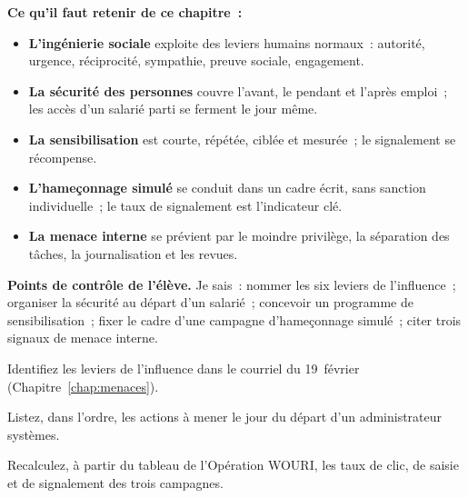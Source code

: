 \separateur

\begin{boxresume}
\textbf{Ce qu'il faut retenir de ce chapitre~:}
\begin{itemize}
    \item \textbf{L'ingénierie sociale} exploite des leviers humains
          normaux~: autorité, urgence, réciprocité, sympathie, preuve
          sociale, engagement.
    \item \textbf{La sécurité des personnes} couvre l'avant, le pendant et
          l'après emploi~; les accès d'un salarié parti se ferment le jour
          même.
    \item \textbf{La sensibilisation} est courte, répétée, ciblée et
          mesurée~; le signalement se récompense.
    \item \textbf{L'hameçonnage simulé} se conduit dans un cadre écrit, sans
          sanction individuelle~; le taux de signalement est l'indicateur
          clé.
    \item \textbf{La menace interne} se prévient par le moindre privilège,
          la séparation des tâches, la journalisation et les revues.
\end{itemize}
\end{boxresume}

\begin{boxinfo}
\textbf{Points de contrôle de l'élève.} Je sais~: nommer les six leviers
de l'influence~; organiser la sécurité au départ d'un salarié~; concevoir
un programme de sensibilisation~; fixer le cadre d'une campagne
d'hameçonnage simulé~; citer trois signaux de menace interne.
\end{boxinfo}

\bigskip

\begin{boxexo}[title={\ding{45}\quad Exercice~9.1. Les leviers \niveaubase}]
Identifiez les leviers de l'influence dans le courriel du 19~février
(Chapitre~\ref{chap:menaces}).
\end{boxexo}

\begin{boxexo}[title={\ding{45}\quad Exercice~9.2. Le départ \niveaubase}]
Listez, dans l'ordre, les actions à mener le jour du départ d'un
administrateur systèmes.
\end{boxexo}

\begin{boxexo}[title={\ding{45}\quad Exercice~9.3. Les taux \niveaubase}]
Recalculez, à partir du tableau de l'Opération WOURI, les taux de clic,
de saisie et de signalement des trois campagnes.
\end{boxexo}

